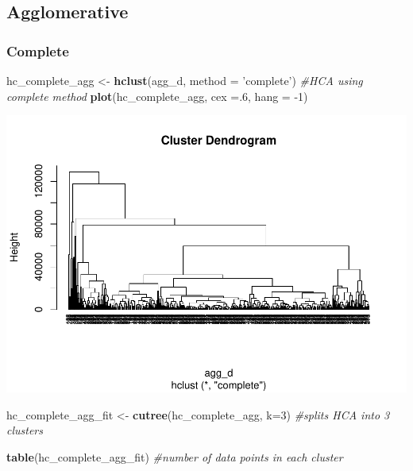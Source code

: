 \documentclass[
  english,
  man]{apa6}
\newenvironment{Shaded}{\begin{snugshade}}{\end{snugshade}}
\newcommand{\CommentTok}[1]{\textcolor[rgb]{0.56,0.35,0.01}{\textit{#1}}}
\newcommand{\DataTypeTok}[1]{\textcolor[rgb]{0.13,0.29,0.53}{#1}}
\newcommand{\DecValTok}[1]{\textcolor[rgb]{0.00,0.00,0.81}{#1}}
\newcommand{\KeywordTok}[1]{\textcolor[rgb]{0.13,0.29,0.53}{\textbf{#1}}}
\newcommand{\NormalTok}[1]{#1}
\newcommand{\StringTok}[1]{\textcolor[rgb]{0.31,0.60,0.02}{#1}}
\begin{document}
\hypertarget{agglomerative}{%
\subsection{Agglomerative}\label{agglomerative}}

\hypertarget{complete}{%
\subsubsection{Complete}\label{complete}}

\begin{Shaded}
\begin{Highlighting}[]
\NormalTok{hc_complete_agg <-}\StringTok{ }\KeywordTok{hclust}\NormalTok{(agg_d, }\DataTypeTok{method =} \StringTok{'complete'}\NormalTok{) }\CommentTok{#HCA using complete method}
\KeywordTok{plot}\NormalTok{(hc_complete_agg, }\DataTypeTok{cex =}\NormalTok{.}\DecValTok{6}\NormalTok{, }\DataTypeTok{hang =} \DecValTok{-1}\NormalTok{)}
\end{Highlighting}
\end{Shaded}

\includegraphics{MSDS680-Week-6-Kmeans-and-HCA_files/figure-latex/complete-1.pdf}

\begin{Shaded}
\begin{Highlighting}[]
\NormalTok{hc_complete_agg_fit <-}\StringTok{ }\KeywordTok{cutree}\NormalTok{(hc_complete_agg, }\DataTypeTok{k=}\DecValTok{3}\NormalTok{) }\CommentTok{#splits HCA into 3 clusters}

\KeywordTok{table}\NormalTok{(hc_complete_agg_fit) }\CommentTok{#number of data points in each cluster}
\end{Highlighting}
\end{Shaded}
\end{document}
